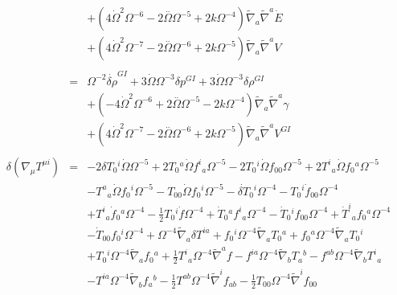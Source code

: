 \begin{eqnarray}
\nonumber\\
&&+ (4 \dot{\Omega}^2 \Omega^{-6} - 2 \overset{..}{\Omega} \Omega^{-5} + 2 k \Omega^{-4}) \tilde{\nabla}_{a}\tilde{\nabla}^{a}\dot{E} \nonumber \\ 
&& + (4 \dot{\Omega}^2 \Omega^{-7} - 2 \overset{..}{\Omega} \Omega^{-6} + 2 k \Omega^{-5}) \tilde{\nabla}_{a}\tilde{\nabla}^{a}V
\\  \nonumber\\ 
&=& \Omega^{-2} \dot{\delta \rho}^{GI}{} + 3 \dot{\Omega} \Omega^{-3} \delta p^{GI}{} + 3 \dot{\Omega} \Omega^{-3} \delta \rho^{GI}{} \nonumber \\ 
&& + (-4 \dot{\Omega}^2 \Omega^{-6} + 2 \overset{..}{\Omega} \Omega^{-5} - 2 k \Omega^{-4}) \tilde{\nabla}_{a}\tilde{\nabla}^{a}\gamma 
\nonumber\\
&&+(4 \dot{\Omega}^2 \Omega^{-7} - 2 \overset{..}{\Omega} \Omega^{-6} + 2 k \Omega^{-5}) \tilde{\nabla}_{a}\tilde{\nabla}^{a}V^{GI}{}
\\ \nonumber\\
\delta(\nabla_\mu T^{\mu i})&=& -2 \delta T_{0}{}^{i} \dot{\Omega} \Omega^{-5} + 2 T_{0}{}^{a} \dot{\Omega} f^{i}{}_{a} \Omega^{-5} - 2 T_{0}{}^{i} \dot{\Omega} f_{00}{} \Omega^{-5} + 2 T^{i}{}_{a} \dot{\Omega} f_{0}{}^{a} \Omega^{-5} 
\nonumber\\
&&-  T^{a}{}_{a} \dot{\Omega} f_{0}{}^{i} \Omega^{-5}  -  T_{00}{} \dot{\Omega} f_{0}{}^{i} \Omega^{-5} -  \dot{\delta T}_{0}{}^{i} \Omega^{-4} -  T_{0}{}^{i} \dot{f}_{00}{} \Omega^{-4} 
\nonumber\\
&&+ T^{i}{}_{a} \dot{f}_{0}{}^{a} \Omega^{-4} 
-  \tfrac{1}{2} T_{0}{}^{i} \dot{f} \Omega^{-4} + \dot{T}_{0}{}^{a} f^{i}{}_{a} \Omega^{-4} -  \dot{T}_{0}{}^{i} f_{00}{} \Omega^{-4} + \dot{T}^{i}{}_{a} f_{0}{}^{a} \Omega^{-4} 
\nonumber\\
&&-  \dot{T}_{00}{} f_{0}{}^{i} \Omega^{-4}
+ \Omega^{-4} \tilde{\nabla}_{a}\delta T^{ia} + f_{0}{}^{i} \Omega^{-4} \tilde{\nabla}_{a}T_{0}{}^{a} + f_{0}{}^{a} \Omega^{-4} \tilde{\nabla}_{a}T_{0}{}^{i}  
\nonumber\\
&&+ T_{0}{}^{i} \Omega^{-4} \tilde{\nabla}_{a}f_{0}{}^{a} 
+ \tfrac{1}{2} T^{i}{}_{a} \Omega^{-4} \tilde{\nabla}^{a}f -  f^{ia} \Omega^{-4} \tilde{\nabla}_{b}T_{a}{}^{b} -  f^{ab} \Omega^{-4} \tilde{\nabla}_{b}T^{i}{}_{a} 
\nonumber\\
&&-  T^{ia} \Omega^{-4} \tilde{\nabla}_{b}f_{a}{}^{b}-  \tfrac{1}{2} T^{ab} \Omega^{-4} \tilde{\nabla}^{i}f_{ab} -  \tfrac{1}{2} T_{00}{} \Omega^{-4} \tilde{\nabla}^{i}f_{00}{} 
\nonumber\\

\end{eqnarray}
